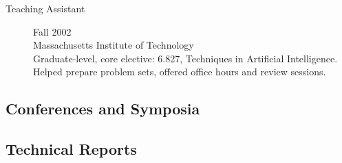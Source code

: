 \documentclass[overlapped,line,letterpaper]{res}
\makeatletter
\def\section{\@ifnextchar*\@@section@star\@@section}
\def\@@section@star*{\@@section}
\makeatother
\begin{document}
\begin{resume}
\begin{description}
\item [Teaching Assistant] \dotfill  Fall 2002\\
Massachusetts Institute of Technology\\
Graduate-level, core elective: 6.827, Techniques in Artificial Intelligence.\\
Helped prepare problem sets, offered office hours and review sessions.


\end{description}




\section{Papers}
\vspace{-.07in}





\subsection{Conferences and Symposia} 


\vspace{-.4in}\begin{bibunit}[myresume]
    \nocite{gardiol07,gardiol06,gardiol03nips,finney02,kaelbling01,gardiol00nips} 
     \end{bibunit}
     
\subsection{Technical Reports} 

\vspace{-.4in} \begin{bibunit}[myresume]
 \nocite{gardiol08tr, gardiolphd, nhg06tr, gardiolms, deictic02}
 \end{bibunit}




\end{resume}
\end{document}
